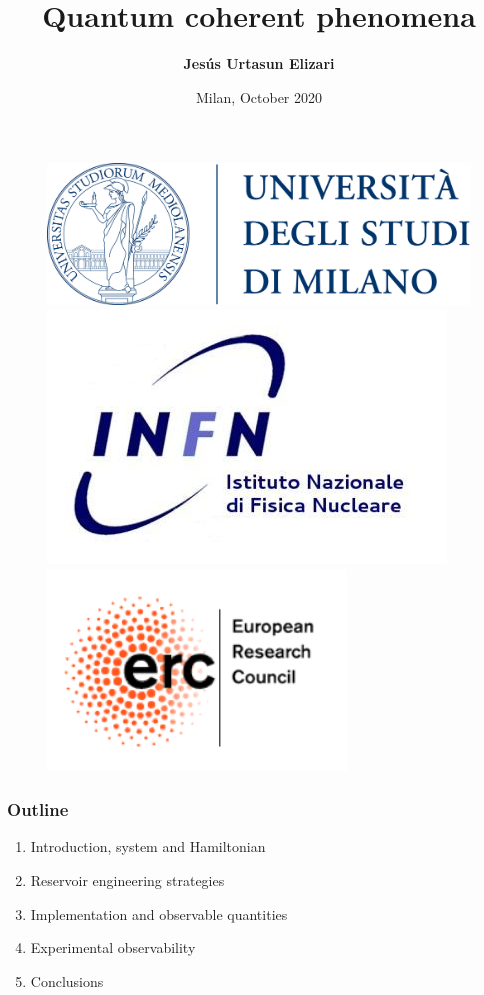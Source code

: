 \documentclass[aspectratio=43]{beamer}
\title[Quantum coherent phenomena]{Quantum coherent phenomena}
\author{\textbf {Jes\'us Urtasun Elizari}}
\date{Milan, October 2020}
\begin{document}
\begin{frame}

	\vspace{1.0 cm}
	
	
	\vspace{0.25 cm}

	\begin{figure}
		\includegraphics[width = 3.0 cm]{plots/logo_unimi.png}
		\hfill
		\includegraphics[width = 3.0 cm]{plots/logo_infn.png}
		\hfill
		\includegraphics[width = 3.0 cm]{plots/logo_erc.png}
		\endminipage
	\end{figure}

	\vspace{1.0 cm}

\end{frame}

\begin{frame}

	\frametitle{Outline}
	
	\begin{enumerate}
		\item {\color{blue}Introduction, system and Hamiltonian}
		\item {\color{blue}Reservoir engineering strategies}
		\item {\color{blue}Implementation and observable quantities}
		\item {\color{blue}Experimental observability}
		\item {\color{blue}Conclusions}
	\end{enumerate}
	
\end{frame}
\end{document}
